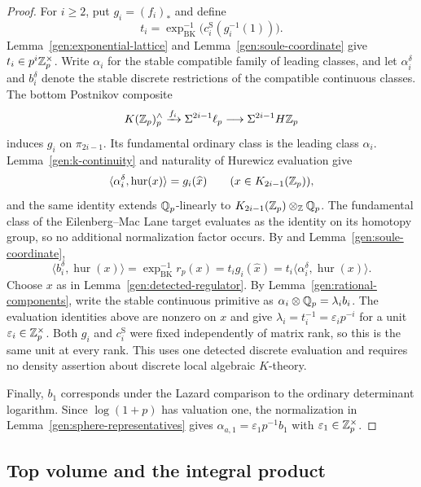 \begin{proof}
For $i\geq2$, put
$g_i=(f_i)_*$ and define
\[
 t_i=\exp_{\mathrm{BK}}^{-1}
       \bigl(c_i^{\mathrm S}(g_i^{-1}(1))\bigr).
\]
Lemma~\ref{gen:exponential-lattice} and
Lemma~\ref{gen:soule-coordinate} give $t_i\in p^i\mathbb Z_p^\times$.
Write $\alpha_i$ for the stable compatible family of leading classes,
and let $\alpha_i^\delta$ and $b_i^\delta$ denote the stable discrete
restrictions of the compatible continuous classes.  The bottom
Postnikov composite
\[
 K(\mathbb Z_p)^\wedge_p\xrightarrow{f_i}\Sigma^{2i-1}\ell_p
       \longrightarrow\Sigma^{2i-1}H\mathbb Z_p
\]
induces $g_i$ on $\pi_{2i-1}$.  Its fundamental ordinary class is
the leading class $\alpha_i$.  Lemma~\ref{gen:k-continuity} and
naturality of Hurewicz evaluation give
\[
 \langle\alpha_i^\delta,\operatorname{hur}(x)\rangle
       =g_i(\widehat x)
 \qquad (x\in K_{2i-1}(\mathbb Z_p)),
\]
and the same identity extends $\mathbb Q_p$-linearly to
$K_{2i-1}(\mathbb Z_p)\otimes_{\mathbb Z}\mathbb Q_p$.  The fundamental
class of the Eilenberg--Mac Lane target evaluates as the identity on
its homotopy group, so no additional normalization factor occurs.
By \cite[Definition~1.2.3 and Theorem~1.3.2]{HuberKings} and
Lemma~\ref{gen:soule-coordinate},
\[
 \langle b_i^\delta,\operatorname{hur}(x)\rangle
   =\exp_{\mathrm{BK}}^{-1}r_p(x)
   =t_i g_i(\widehat x)
   =t_i\langle\alpha_i^\delta,\operatorname{hur}(x)\rangle.
\]
Choose $x$ as in Lemma~\ref{gen:detected-regulator}.  By
Lemma~\ref{gen:rational-components}, write the stable continuous
primitive as $\alpha_i\otimes\mathbb Q_p=\lambda_i b_i$.  The evaluation
identities above are nonzero on $x$ and give
$\lambda_i=t_i^{-1}=\varepsilon_i p^{-i}$ for a unit
$\varepsilon_i\in\mathbb Z_p^\times$.  Both $g_i$ and $c_i^{\mathrm S}$
were fixed independently of matrix rank, so this is the same unit
at every rank.  This uses one detected discrete evaluation and
requires no density assertion about discrete local algebraic
$K$-theory.

Finally, $b_1$ corresponds under the Lazard comparison to the ordinary
determinant logarithm.  Since $\log(1+p)$ has valuation one, the
normalization in Lemma~\ref{gen:sphere-representatives} gives
$\alpha_{a,1}=\varepsilon_1p^{-1}b_1$ with
$\varepsilon_1\in\mathbb Z_p^\times$.
\end{proof}

\subsection{Top volume and the integral product}
\label{gen:volume-section}

